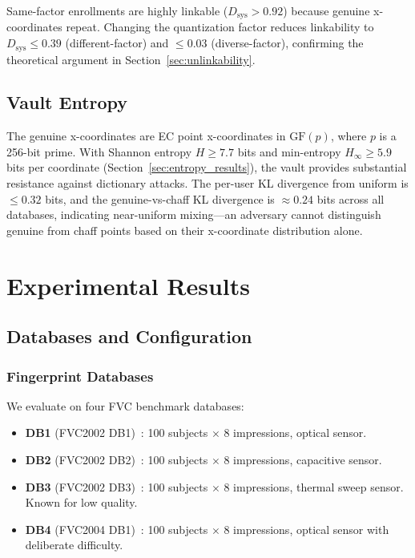 \documentclass[3p,twocolumn]{elsarticle}
\newcommand{\GFp}{\mathrm{GF}(p)}
\begin{document}
Same-factor enrollments are highly linkable ($D_{\text{sys}} > 0.92$) because genuine x-coordinates repeat. Changing the quantization factor reduces linkability to $D_{\text{sys}} \leq 0.39$ (different-factor) and $\leq 0.03$ (diverse-factor), confirming the theoretical argument in Section~\ref{sec:unlinkability}.

\subsection{Vault Entropy}
\label{sec:vault_entropy}

The genuine x-coordinates are EC point x-coordinates in $\GFp{}$, where $p$ is a 256-bit prime. With Shannon entropy $H \geq 7.7$ bits and min-entropy $H_\infty \geq 5.9$ bits per coordinate (Section~\ref{sec:entropy_results}), the vault provides substantial resistance against dictionary attacks. The per-user KL divergence from uniform is $\leq 0.32$ bits, and the genuine-vs-chaff KL divergence is $\approx 0.24$ bits across all databases, indicating near-uniform mixing---an adversary cannot distinguish genuine from chaff points based on their x-coordinate distribution alone.

\section{Experimental Results}
\label{sec:experiments}

\subsection{Databases and Configuration}
\label{sec:databases}

\subsubsection{Fingerprint Databases}
We evaluate on four FVC benchmark databases:
\begin{itemize}
    \item \textbf{DB1} (FVC2002 DB1)~\cite{maio2002fvc2002}: 100 subjects $\times$ 8 impressions, optical sensor.
    \item \textbf{DB2} (FVC2002 DB2)~\cite{maio2002fvc2002}: 100 subjects $\times$ 8 impressions, capacitive sensor.
    \item \textbf{DB3} (FVC2002 DB3)~\cite{maio2002fvc2002}: 100 subjects $\times$ 8 impressions, thermal sweep sensor. Known for low quality.
    \item \textbf{DB4} (FVC2004 DB1)~\cite{maio2004fvc2004}: 100 subjects $\times$ 8 impressions, optical sensor with deliberate difficulty.
\end{itemize}
\end{document}
